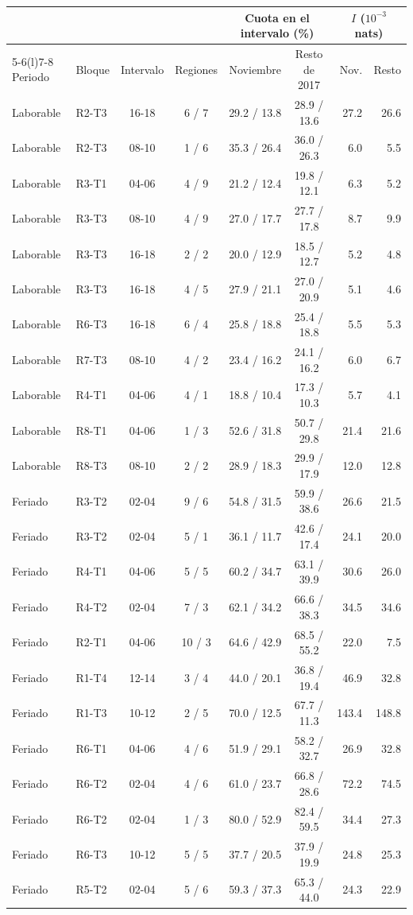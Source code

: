 \begin{tabular}{@{}llccccrr@{}}
\toprule
 & & & & \multicolumn{2}{c}{Cuota en el intervalo (\%)} & \multicolumn{2}{c}{$I$ ($10^{-3}$ nats)} \\
\cmidrule(lr){5-6}\cmidrule(l){7-8}
Periodo & Bloque & Intervalo & Regiones & Noviembre & Resto de 2017 & Nov. & Resto \\
\midrule
Laborable & R2-T3 & 16-18 & 6 / 7 & 29.2 / 13.8 & 28.9 / 13.6 & 27.2 & 26.6 \\
Laborable & R2-T3 & 08-10 & 1 / 6 & 35.3 / 26.4 & 36.0 / 26.3 & 6.0 & 5.5 \\
Laborable & R3-T1 & 04-06 & 4 / 9 & 21.2 / 12.4 & 19.8 / 12.1 & 6.3 & 5.2 \\
Laborable & R3-T3 & 08-10 & 4 / 9 & 27.0 / 17.7 & 27.7 / 17.8 & 8.7 & 9.9 \\
Laborable & R3-T3 & 16-18 & 2 / 2 & 20.0 / 12.9 & 18.5 / 12.7 & 5.2 & 4.8 \\
Laborable & R3-T3 & 16-18 & 4 / 5 & 27.9 / 21.1 & 27.0 / 20.9 & 5.1 & 4.6 \\
Laborable & R6-T3 & 16-18 & 6 / 4 & 25.8 / 18.8 & 25.4 / 18.8 & 5.5 & 5.3 \\
Laborable & R7-T3 & 08-10 & 4 / 2 & 23.4 / 16.2 & 24.1 / 16.2 & 6.0 & 6.7 \\
Laborable & R4-T1 & 04-06 & 4 / 1 & 18.8 / 10.4 & 17.3 / 10.3 & 5.7 & 4.1 \\
Laborable & R8-T1 & 04-06 & 1 / 3 & 52.6 / 31.8 & 50.7 / 29.8 & 21.4 & 21.6 \\
Laborable & R8-T3 & 08-10 & 2 / 2 & 28.9 / 18.3 & 29.9 / 17.9 & 12.0 & 12.8 \\
Feriado & R3-T2 & 02-04 & 9 / 6 & 54.8 / 31.5 & 59.9 / 38.6 & 26.6 & 21.5 \\
Feriado & R3-T2 & 02-04 & 5 / 1 & 36.1 / 11.7 & 42.6 / 17.4 & 24.1 & 20.0 \\
Feriado & R4-T1 & 04-06 & 5 / 5 & 60.2 / 34.7 & 63.1 / 39.9 & 30.6 & 26.0 \\
Feriado & R4-T2 & 02-04 & 7 / 3 & 62.1 / 34.2 & 66.6 / 38.3 & 34.5 & 34.6 \\
Feriado & R2-T1 & 04-06 & 10 / 3 & 64.6 / 42.9 & 68.5 / 55.2 & 22.0 & 7.5 \\
Feriado & R1-T4 & 12-14 & 3 / 4 & 44.0 / 20.1 & 36.8 / 19.4 & 46.9 & 32.8 \\
Feriado & R1-T3 & 10-12 & 2 / 5 & 70.0 / 12.5 & 67.7 / 11.3 & 143.4 & 148.8 \\
Feriado & R6-T1 & 04-06 & 4 / 6 & 51.9 / 29.1 & 58.2 / 32.7 & 26.9 & 32.8 \\
Feriado & R6-T2 & 02-04 & 4 / 6 & 61.0 / 23.7 & 66.8 / 28.6 & 72.2 & 74.5 \\
Feriado & R6-T2 & 02-04 & 1 / 3 & 80.0 / 52.9 & 82.4 / 59.5 & 34.4 & 27.3 \\
Feriado & R6-T3 & 10-12 & 5 / 5 & 37.7 / 20.5 & 37.9 / 19.9 & 24.8 & 25.3 \\
Feriado & R5-T2 & 02-04 & 5 / 6 & 59.3 / 37.3 & 65.3 / 44.0 & 24.3 & 22.9 \\
\bottomrule
\end{tabular}
